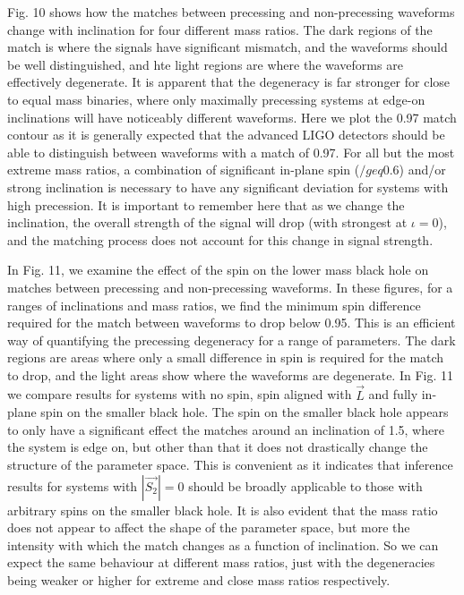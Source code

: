 \documentclass[11pt]{article}
\begin{document}
Fig. 10 shows how the matches between precessing and non-precessing waveforms change with inclination for four different mass ratios. The dark regions of the match is where the signals have significant mismatch, and the waveforms should be well distinguished, and hte light regions are where the waveforms are effectively degenerate. It is apparent that the degeneracy is far stronger for close to equal mass binaries, where only maximally precessing systems at edge-on inclinations will have noticeably different waveforms. Here we plot the 0.97 match contour as it is generally expected that the advanced LIGO detectors should be able to distinguish between waveforms with a match of 0.97. For all but the most extreme mass ratios, a combination of significant in-plane spin ($/geq0.6$) and/or strong inclination is necessary to have any significant deviation for systems with high precession. It is important to remember here that as we change the inclination, the overall strength of the signal will drop (with strongest at $\iota=0$), and the matching process does not account for this change in signal strength.

In Fig. 11, we examine the effect of the spin on the lower mass black hole on matches between precessing and non-precessing waveforms. In these figures, for a ranges of inclinations and mass ratios, we find the minimum spin difference required for the match between waveforms to drop below 0.95. This is an efficient way of quantifying the precessing degeneracy for a range of parameters. The dark regions are areas where only a small difference in spin is required for the match to drop, and the light areas show where the waveforms are degenerate. In Fig. 11 we compare results for systems with no spin, spin aligned with $\vec{L}$ and fully in-plane spin on the smaller black hole. The spin on the smaller black hole appears to only have a significant effect the matches around an inclination of 1.5, where the system is edge on, but other than that it does not drastically change the structure of the parameter space. This is convenient as it indicates that inference results for systems with $|\vec{S_2}|=0$ should be broadly applicable to those with arbitrary spins on the smaller black hole. It is also evident that the mass ratio does not appear to affect the shape of the parameter space, but more the intensity with which the match changes as a function of inclination. So we can expect the same behaviour at different mass ratios, just with the degeneracies being weaker or higher for extreme and close mass ratios respectively.
\end{document}
